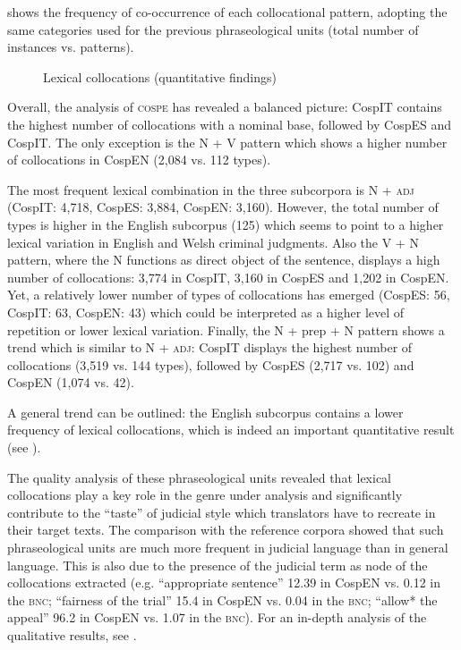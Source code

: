 \documentclass[output=paper]{LSP/langsci}
\begin{document}
 shows the frequency of co-occurrence of each collocational pattern, adopting the same categories used for the previous phraseological units (total number of instances vs. patterns).

\begin{figure}

\caption{Lexical collocations (quantitative findings)} \label{fig:6:3}
\end{figure}

Overall, the analysis of \textsc{cospe} has revealed a balanced picture: CospIT contains the highest number of collocations with a nominal base, followed by CospES and CospIT. The only exception is the N + V pattern which shows a higher number of collocations in CospEN (2,084 vs. 112 types).

The most frequent lexical combination in the three subcorpora is N + \textsc{adj} (CospIT: 4,718, CospES: 3,884, CospEN: 3,160). However, the total number of types is higher in the English subcorpus (125) which seems to point to a higher lexical variation in English and Welsh criminal judgments. Also the V + N pattern, where the N functions as direct object of the sentence, displays a high number of collocations: 3,774 in CospIT, 3,160 in CospES and 1,202 in CospEN. Yet, a relatively lower number of types of collocations has emerged (CospES: 56, CospIT: 63, CospEN: 43) which could be interpreted as a higher level of repetition or lower lexical variation. Finally, the N + prep + N pattern shows a trend which is similar to N + \textsc{adj}: CospIT displays the highest number of collocations (3,519 vs. 144 types), followed by CospES (2,717 vs. 102) and CospEN (1,074 vs. 42).

A general trend can be outlined: the English subcorpus contains a lower frequency of lexical collocations, which is \enlargethispage{1\baselineskip} indeed an important quantitative result (see ).

The quality analysis of these phraseological units revealed that lexical collocations play a key role in the genre under analysis and significantly contribute to the “taste” of judicial style which translators have to recreate in their target texts. The comparison with the reference corpora showed that such phraseological units are much more frequent in judicial language than in general language. This is also due to the presence of the judicial term as node of the collocations extracted (e.g. “appropriate sentence” 12.39 in CospEN vs. 0.12 in the \textsc{bnc}; “fairness of the trial” 15.4 in CospEN vs. 0.04 in the \textsc{bnc}; “allow* the appeal” 96.2 in CospEN vs. 1.07 in the \textsc{bnc}). For an in-depth analysis of the qualitative results, see \citep[241--252][]{Pontrandolfo2013a}.
\end{document}
